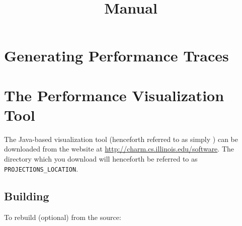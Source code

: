 \documentclass[10pt]{report}
\title{\projections{} Manual}
\begin{document}
\maketitle

\chapter{Generating Performance Traces}


%
%

\newpage

\chapter{The \projections{} Performance Visualization Tool}
\label{sec::visualization}

The \projections{} Java-based visualization tool (henceforth referred
to as simply \projections{}) can be downloaded from the \charmpp{}
website at \url{http://charm.cs.illinois.edu/software}.
The directory which you download will henceforth be referred to
as {\tt PROJECTIONS\_LOCATION}.

\section{Building \projections{}}

To rebuild \projections{} (optional) from the source:
\end{document}

